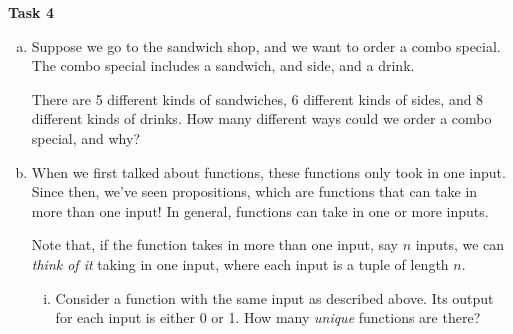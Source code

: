 \documentclass[12pt,letterpaper]{article}
\begin{document}
  \textbf{Task 4}
  \begin{enumerate}[a.]
      \item Suppose we go to the sandwich shop, and we want to order a combo special. The combo special includes a sandwich, and side, and a drink.
      
      There are 5 different kinds of sandwiches, 6 different kinds of sides, and 8 different kinds of drinks. How many different ways could we order a combo special, and why?
      
      \begin{mdframed} \vspace{2cm} \end{mdframed}
      
      \item When we first talked about functions, these functions only took in one input. Since then, we've seen propositions, which are functions that can take in more than one input! In general, functions can take in one or more inputs. 
      
      Note that, if the function takes in more than one input, say $n$ inputs, we can \textit{think of it} taking in one input, where each input is a tuple of length $n$.
      \begin{enumerate}[i.]

        \item Consider a function with the same input as described above. Its output for each input is either 0 or 1. How many \textit{unique} functions are there?
        

\end{enumerate}
\end{enumerate}
\end{document}

